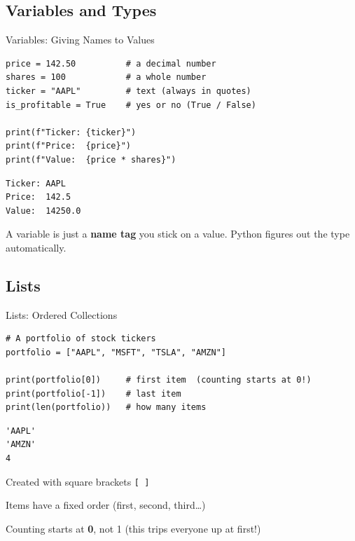 \documentclass[9pt,aspectratio=169]{beamer}
\begin{document}
\subsection{Variables and Types}
\begin{frame}[fragile]{Variables: Giving Names to Values}

\begin{lstlisting}
price = 142.50          # a decimal number
shares = 100            # a whole number
ticker = "AAPL"         # text (always in quotes)
is_profitable = True    # yes or no (True / False)

print(f"Ticker: {ticker}")
print(f"Price:  {price}")
print(f"Value:  {price * shares}")
\end{lstlisting}

\begin{lstlisting}[style=output]
Ticker: AAPL
Price:  142.5
Value:  14250.0
\end{lstlisting}

\begin{highlightbox}
\centering
A variable is just a \textbf{name tag} you stick on a value. Python figures out the type automatically.
\end{highlightbox}

\end{frame}


\subsection{Lists}
\begin{frame}[fragile]{Lists: Ordered Collections}

\begin{lstlisting}
# A portfolio of stock tickers
portfolio = ["AAPL", "MSFT", "TSLA", "AMZN"]

print(portfolio[0])     # first item  (counting starts at 0!)
print(portfolio[-1])    # last item
print(len(portfolio))   # how many items
\end{lstlisting}

\begin{lstlisting}[style=output]
'AAPL'
'AMZN'
4
\end{lstlisting}

\bi
    \item Created with square brackets \texttt{[~]}
    \item Items have a fixed \alert{order} (first, second, third\ldots)
    \item Counting starts at \textbf{0}, not 1 (this trips everyone up at first!)
\ei

\end{frame}
\end{document}
